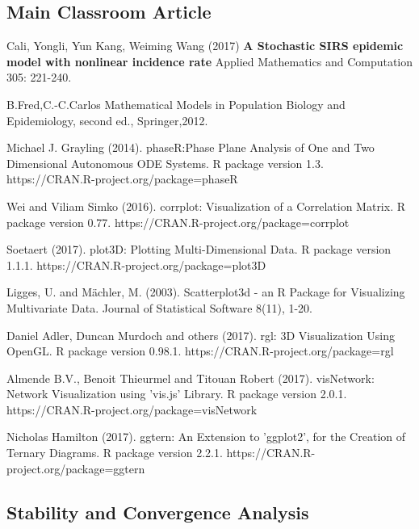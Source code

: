 
\begin{thebibliography}{00}

\subsection{Main Classroom Article}

Cali, Yongli, Yun Kang, Weiming Wang (2017)
\newblock \textbf{A Stochastic SIRS epidemic model with nonlinear incidence rate}
\newblock Applied Mathematics and Computation 305: 221-240.

B.Fred,C.-C.Carlos
\newblock Mathematical Models in Population Biology and Epidemiology,
\newblock second ed., Springer,2012.

Michael J. Grayling (2014). 
\newblock phaseR:Phase Plane Analysis of One and Two Dimensional Autonomous ODE Systems. 
\newblock R package version 1.3. https://CRAN.R-project.org/package=phaseR

 Wei and Viliam Simko (2016).
\newblock corrplot: Visualization of a Correlation Matrix. 
\newblock R package version 0.77. https://CRAN.R-project.org/package=corrplot

 Soetaert (2017). 
\newblock plot3D: Plotting Multi-Dimensional Data. 
\newblock R package version 1.1.1. https://CRAN.R-project.org/package=plot3D

 Ligges, U. and Mächler, M. (2003).
\newblock Scatterplot3d - an R Package for Visualizing Multivariate Data.
\newblock Journal of Statistical Software 8(11), 1-20.

Daniel Adler, Duncan Murdoch and others (2017). 
\newblock rgl: 3D Visualization Using OpenGL. 
\newblock R package version 0.98.1. https://CRAN.R-project.org/package=rgl

 Almende B.V., Benoit Thieurmel and Titouan Robert (2017). visNetwork:
\newblock Network Visualization using 'vis.js' Library. R package version 2.0.1.
\newblock https://CRAN.R-project.org/package=visNetwork

 Nicholas Hamilton (2017). 
\newblock ggtern: An Extension to 'ggplot2', for the Creation of Ternary Diagrams. 
\newblock R package version 2.2.1. https://CRAN.R-project.org/package=ggtern

\subsection{Stability and Convergence Analysis}


\end{thebibliography}
